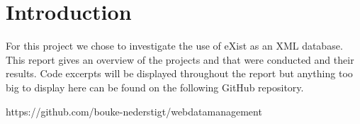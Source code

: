 \documentclass[Intro.tex]{subfiles}
\begin{document}
\section{Introduction}
For this project we chose to investigate the use of eXist as an XML database. This report gives an overview of the projects and that were conducted and their results. Code excerpts will be displayed throughout the report but anything too big to display here can be found on the following GitHub repository. 

https://github.com/bouke-nederstigt/webdatamanagement
\end{document}
